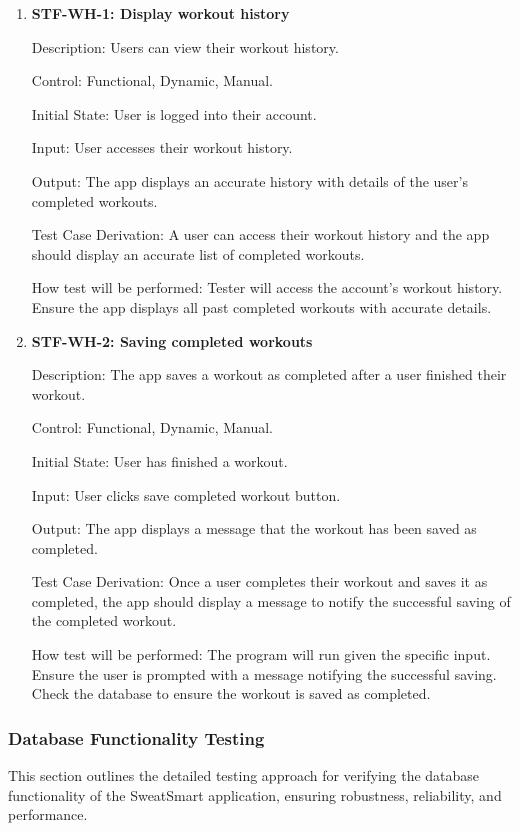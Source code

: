 \documentclass[12pt, titlepage]{article}
\begin{document}
    \begin{enumerate}

        \item{\textbf{STF-WH-1: Display workout history}\\}

        Description: Users can view their workout history.

        Control: Functional, Dynamic, Manual.

        Initial State: User is logged into their account.

        Input: User accesses their workout history.

        Output: The app displays an accurate history with details of the user’s completed workouts.

        Test Case Derivation: A user can access their workout history and the app should display an accurate list of completed workouts.

        How test will be performed: Tester will access the account’s workout history. Ensure the app displays all past completed workouts with accurate details.

        \item{\textbf{STF-WH-2: Saving completed workouts}\\}

        Description: The app saves a workout as completed after a user finished their workout.

        Control: Functional, Dynamic, Manual.

        Initial State: User has finished a workout.

        Input: User clicks save completed workout button.

        Output: The app displays a message that the workout has been saved as completed.

        Test Case Derivation: Once a user completes their workout and saves it as completed, the app should display a message to notify the successful saving of the completed workout.

        How test will be performed: The program will run given the specific input. Ensure the user is prompted with a message notifying the successful saving. Check the database to ensure the workout is saved as completed.

    \end{enumerate}

\subsubsection{Database Functionality Testing}
This section outlines the detailed testing approach for verifying the database functionality of the SweatSmart application, ensuring robustness, reliability, and performance.
\end{document}
